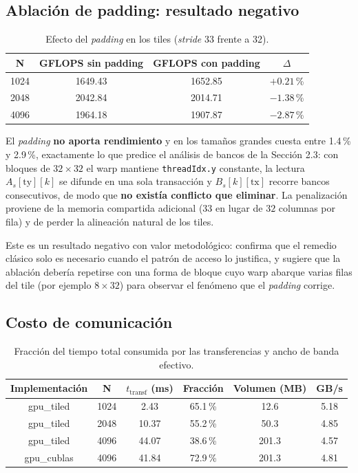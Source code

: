\subsection{Ablación de padding: resultado negativo}

	\begin{table}[H]
		\centering
		\caption{Efecto del \textit{padding} en los tiles (\textit{stride} 33 frente a 32).}
		\begin{tabular}{cccc}
			\hline
			\textbf{N} & \textbf{GFLOPS sin padding} & \textbf{GFLOPS con padding} & \textbf{$\Delta$} \bigstrut\\
			\hline
			1024 & 1649.43 & 1652.85 & $+0.21$\,\% \\
			2048 & 2042.84 & 2014.71 & $-1.38$\,\% \\
			4096 & 1964.18 & 1907.87 & $-2.87$\,\% \bigstrut[b]\\
			\hline
		\end{tabular}
		\label{tab:padding-u3}
	\end{table}

	El \textit{padding} \textbf{no aporta rendimiento} y en los tamaños grandes cuesta entre 1.4\,\% y 2.9\,\%, exactamente lo que predice el análisis de bancos de la Sección 2.3: con bloques de $32 \times 32$ el warp mantiene \texttt{threadIdx.y} constante, la lectura $A_s[\text{ty}][k]$ se difunde en una sola transacción y $B_s[k][\text{tx}]$ recorre bancos consecutivos, de modo que \textbf{no existía conflicto que eliminar}. La penalización proviene de la memoria compartida adicional ($33$ en lugar de $32$ columnas por fila) y de perder la alineación natural de los tiles.

	Este es un resultado negativo con valor metodológico: confirma que el remedio clásico solo es necesario cuando el patrón de acceso lo justifica, y sugiere que la ablación debería repetirse con una forma de bloque cuyo warp abarque varias filas del tile (por ejemplo $8 \times 32$) para observar el fenómeno que el \textit{padding} corrige.

\subsection{Costo de comunicación}

	\begin{table}[H]
		\centering
		\caption{Fracción del tiempo total consumida por las transferencias y ancho de banda efectivo.}
		\begin{tabular}{cccccc}
			\hline
			\textbf{Implementación} & \textbf{N} & \textbf{$t_{\text{transf}}$ (ms)} & \textbf{Fracción} & \textbf{Volumen (MB)} & \textbf{GB/s} \bigstrut\\
			\hline
			gpu\_tiled & 1024 & 2.43 & 65.1\,\% & 12.6 & 5.18 \\
			gpu\_tiled & 2048 & 10.37 & 55.2\,\% & 50.3 & 4.85 \\
			gpu\_tiled & 4096 & 44.07 & 38.6\,\% & 201.3 & 4.57 \\
			gpu\_cublas & 4096 & 41.84 & 72.9\,\% & 201.3 & 4.81 \bigstrut[b]\\
			\hline
		\end{tabular}
		\label{tab:transf-u3}
	\end{table}

